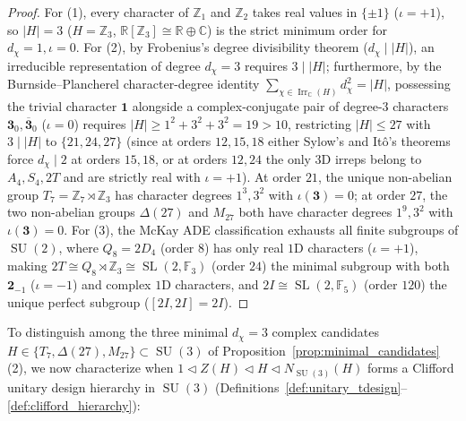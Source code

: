 \documentclass[11pt,a4paper]{article}
\theoremstyle{definition}
\theoremstyle{remark}
\newcommand{\R}{\mathbb{R}}
\newcommand{\C}{\mathbb{C}}
\newcommand{\Z}{\mathbb{Z}}
\newcommand{\F}{\mathbb{F}}
\newcommand{\Irr}{\operatorname{Irr}}
\newcommand{\SU}{\operatorname{SU}}
\newcommand{\SL}{\operatorname{SL}}
\begin{document}
\begin{proof}
For (1), every character of $\Z_1$ and $\Z_2$ takes real values in $\{\pm 1\}$ ($\iota = +1$), so $|H| = 3$ ($H = \Z_3$, $\R[\Z_3] \cong \R \oplus \C$) is the strict minimum order for $d_\chi = 1, \iota = 0$. For (2), by Frobenius's degree divisibility theorem ($d_\chi \mid |H|$), an irreducible representation of degree $d_\chi = 3$ requires $3 \mid |H|$; furthermore, by the Burnside--Plancherel character-degree identity $\sum_{\chi \in \Irr_{\C}(H)} d_\chi^2 = |H|$, possessing the trivial character $\mathbf{1}$ alongside a complex-conjugate pair of degree-$3$ characters $\mathbf{3}_0, \overline{\mathbf{3}}_0$ ($\iota = 0$) requires $|H| \ge 1^2 + 3^2 + 3^2 = 19 > 10$, restricting $|H| \le 27$ with $3 \mid |H|$ to $\{21, 24, 27\}$ (since at orders $12, 15, 18$ either Sylow's and It\^o's theorems force $d_\chi \mid 2$ at orders $15, 18$, or at orders $12, 24$ the only $3$D irreps belong to $A_4, S_4, 2T$ and are strictly real with $\iota = +1$). At order $21$, the unique non-abelian group $T_7 = \Z_7 \rtimes \Z_3$ has character degrees $1^3, 3^2$ with $\iota(\mathbf{3}) = 0$; at order $27$, the two non-abelian groups $\Delta(27)$ and $M_{27}$ both have character degrees $1^9, 3^2$ with $\iota(\mathbf{3}) = 0$. For (3), the McKay ADE classification exhausts all finite subgroups of $\SU(2)$, where $Q_8 = 2D_4$ (order $8$) has only real $1$D characters ($\iota = +1$), making $2T \cong Q_8 \rtimes \Z_3 \cong \SL(2,\F_3)$ (order $24$) the minimal subgroup with both $\mathbf{2}_{-1}$ ($\iota = -1$) and complex $1$D characters, and $2I \cong \SL(2,\F_5)$ (order $120$) the unique perfect subgroup ($[2I,2I]=2I$).
\end{proof}

To distinguish among the three minimal $d_\chi = 3$ complex candidates $H \in \{T_7, \Delta(27), M_{27}\} \subset \SU(3)$ of Proposition~\ref{prop:minimal_candidates}(2), we now characterize when $1 \triangleleft Z(H) \triangleleft H \triangleleft N_{\SU(3)}(H)$ forms a Clifford unitary design hierarchy in $\SU(3)$ (Definitions~\ref{def:unitary_tdesign}--\ref{def:clifford_hierarchy}):
\end{document}
